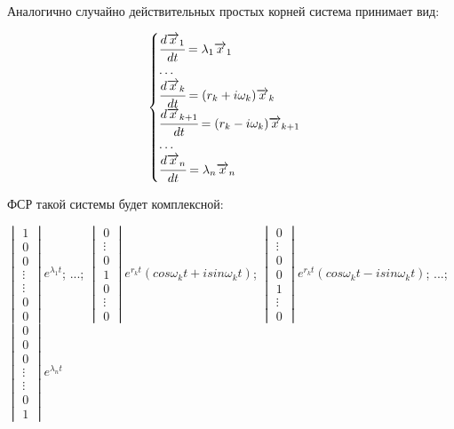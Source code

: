 Аналогично случайно действительных простых корней система принимает вид: 

\[ \begin{cases}
  \cfrac{d \overrightarrow{x}_1}{dt} = \lambda_1 \overrightarrow{x}_1 \\ 
  \ldots \\
  \cfrac{d \overrightarrow{x}_k}{dt} = (r_k + i \omega_k)\overrightarrow{x}_k \\
  \cfrac{d \overrightarrow{x}_{k+1}}{dt} = (r_k - i \omega_k)\overrightarrow{x}_{k+1} \\
  \ldots \\
  \cfrac{d \overrightarrow{x}_n}{dt} = \lambda_n \overrightarrow{x}_n
\end{cases}\]

ФСР такой системы будет комплексной:

$\begin{vmatrix*} 1 \\ 0 \\ 0 \\ \vdots \\ \vdots \\ 0 \\ 0 \end{vmatrix*} e^{\lambda_1 t}$; ...; 
$\begin{vmatrix*} 0 \\ \vdots \\ 0 \\ 1 \\ 0 \\ \vdots \\ 0 \end{vmatrix*} e^{r_k t} (cos \omega_k t + i sin \omega_k t)$;
$\begin{vmatrix*} 0 \\ \vdots \\ 0 \\ 0 \\ 1 \\ \vdots \\ 0 \end{vmatrix*} e^{r_k t} (cos \omega_k t - i sin \omega_k t)$; ...; 
$\begin{vmatrix*} 0 \\ 0 \\ 0 \\ \vdots \\ \vdots \\ 0 \\ 1 \end{vmatrix*} e^{\lambda_n t}$

